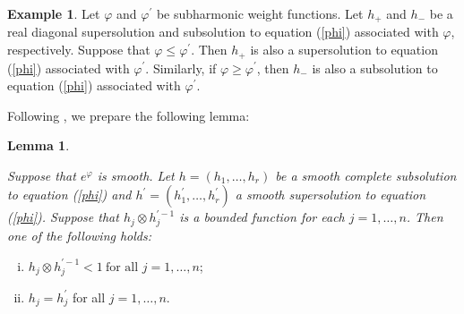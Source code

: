 \documentclass[12pt]{article}
\theoremstyle{definition}
\newtheorem{lemm}[defi]{Lemma}
\newtheorem{ex}[defi]{Example}
\begin{document}
\begin{ex}\label{subandsuper} Let $\varphi$ and $\varphi^\prime$ be subharmonic weight functions. Let $h_+$ and $h_-$ be a real diagonal supersolution and subsolution to equation (\ref{phi}) associated with $\varphi$, respectively. Suppose that $\varphi \leq \varphi^\prime$. Then $h_+$ is also a supersolution to equation (\ref{phi}) associated with $\varphi^\prime$. Similarly, if $\varphi \geq \varphi^\prime$, then $h_-$ is also a subsolution to equation (\ref{phi}) associated with $\varphi^\prime$.
\end{ex}
Following \cite[Proposition 4.6]{LM1}, we prepare the following lemma:
\begin{lemm}\label{cands}{\it Suppose that $e^\varphi$ is smooth. Let $h=(h_1,\dots, h_r)$ be a smooth complete subsolution to equation (\ref{phi}) and $h^\prime=(h_1^\prime,\dots, h_r^\prime)$ a smooth supersolution to equation (\ref{phi}). Suppose that $h_j \otimes h_j^{\prime-1}$ is a bounded function for each $j=1,\dots, n$. Then one of the following holds: 
\begin{enumerate}[(i)]
\item $h_j\otimes h_j^{\prime-1}<1\ \text{for all $j=1,\dots, n$}$; 
\item $h_j=h_j^\prime$ for all $j=1,\dots, n$.
\end{enumerate}
}
\end{lemm}
\end{document}
